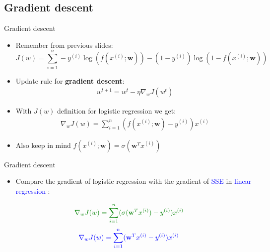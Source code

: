 \documentclass[serif, aspectratio=169]{beamer}
\begin{document}

\subsection{Gradient descent}
\begin{frame}{Gradient descent}
    \begin{itemize}
    \item Remember from previous slides:
        \[
        J(w) = \sum_{i=1}^{n}-y^{(i)}\log (f(x^{(i)}; \mathbf{w})) - 
            (1-y^{(i)})\log (1 - f(x^{(i)}; \mathbf{w}))
        \]
    \item Update rule for \textbf{gradient descent}: 
        \begin{align*}
            w^{t+1} = w^t - \eta \nabla _w J(w^t)
        \end{align*}
    \item With $J(w)$ definition for logistic regression we get:
        \begin{align*}
            \nabla _w J(w) = \sum_{i=1}^{n} (f(x^{(i)}; \mathbf{w}) - y^{(i)})x^{(i)} 
        \end{align*}
    \item Also keep in mind $f(x^{(i)}; \mathbf{w})= \sigma (\mathbf{w}^Tx^{(i)})$
        
    \end{itemize}
\end{frame}
\begin{frame}{Gradient descent}
    \begin{itemize}
    
    \item Compare the gradient of \textcolor{deepgreen}{logistic regression} with the gradient of \textcolor{blue}{SSE} in \textcolor{blue}{linear regression} :
    \end{itemize}
        \begin{align*}
        \color{deepgreen}
             \nabla _w J(w) = \sum_{i=1}^{n} (\sigma (\mathbf{w}^Tx^{(i)}) - y^{(i)})x^{(i)} 
        \end{align*}
        \begin{align*}
            \color{blue}
            \nabla _w J(w) = \sum_{i=1}^{n} (\mathbf{w}^Tx^{(i)} - y^{(i)})x^{(i)}
        \end{align*}
        
\end{frame}
\end{document}
